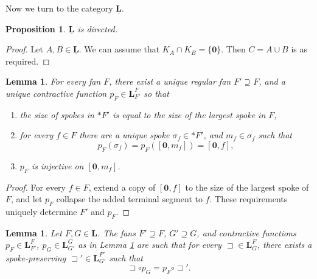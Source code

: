 \documentclass[12pt]{amsart}
\numberwithin{equation}{section}
\theoremstyle{plain}
\newtheorem{lemma}[theorem]{Lemma}
\newtheorem{proposition}[theorem]{\bf Proposition}
\theoremstyle{definition}
\newcommand \sqsp{\sqsupset}
\newcommand \rt{\mathbf{0}}
\newcommand \LLb{\mathbf{L}}
\newcommand \LLub{\underline{\mathbf{L}}}
\begin{document}
Now we turn to the category $\LLub$. 

%
\begin{proposition}
	\label{pr:FAnDirected}
	$\LLub$ is directed.
\end{proposition}

\begin{proof}
	Let $A,B \in \LLub$. We can assume that $K_A \cap K_B=\{\rt\}$. Then $C=A \cup B$ is as required.  
\end{proof}

\begin{lemma}
\label{le:NiceFan}
For every fan $F$, there exist a unique regular fan $F' \supseteq F$,  and a unique contractive function $p_F \in \LLb^F_{F'}$ so that
%
\begin{enumerate}
\item the size of spokes in $*F'$ is equal to the size of the largest spoke in $F$,
\item for every $f \in F$ there are a unique spoke $\sigma_f \in *F'$, and $m_f \in \sigma_f$ such that $$p_F(\sigma_f)=p_F([\rt,m_f])=[\rt,f],$$
\item $p_F$ is injective on $[\rt,m_f]$.
\end{enumerate}
\end{lemma}

\begin{proof}
For every $f\in F$, extend a copy of $[\rt,f]$ to the size of the largest spoke of $F$, and let $p_F$ collapse the added terminal segment to $f$. These requirements uniquely determine $F'$ and $p_F$.
\end{proof}

\begin{lemma}
	\label{le:Lift}
	Let $F,G \in \LLb$. The fans $F' \supseteq F$, $G' \supseteq G$, and contractive functions $p_F \in \LLb^F_{F'}$, $p_G \in \LLb^G_{G'}$ as in Lemma \ref{le:NiceFan} are such that for every $\sqsp \in \LLb^F_G$, there exists a spoke-preserving $\sqsp'  \in \LLb^{F'}_{G'}$ such that $$\sqsp \circ p_G=p_F \circ \sqsp'.$$ %
\end{lemma}
\end{document}
